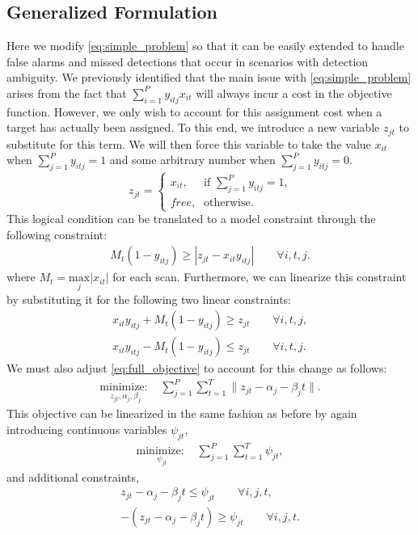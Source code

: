 \subsection{Generalized Formulation}
Here we modify \eqref{eq:simple_problem} so that it can be easily extended to handle false alarms and missed detections that occur in scenarios with detection ambiguity. We previously identified that the main issue with \eqref{eq:simple_problem} arises from the fact that $\sum_{i=1}^{P}y_{itj}x_{it}$ will always incur a cost in the objective function. However, we only wish to account for this assignment cost when a target has actually been assigned. To this end, we introduce a new variable $z_{jt}$ to substitute for this term. We will then force this variable to take the value $x_{it}$ when $\sum_{j=1}^{P}y_{itj}=1$ and some arbitrary number when $\sum_{j=1}^{P}y_{itj}=0$. 
\[z_{jt} =
\begin{cases}
x_{it}, & \text{if $\sum_{j=1}^{P} y_{itj} = 1$,} \\
\textit{free}, & \text{otherwise.}
\end{cases}\]
This logical condition can be translated to a model constraint through the following constraint:
\begin{align*}
M_{t}(1-y_{itj}) \geq |z_{jt} - x_{it}y_{itj}| \qquad \forall i,t,j.
\end{align*}
where $M_{t} = \underset{j}{\text{max}}|x_{it}|$ for each scan. Furthermore, we can linearize this constraint by substituting it for the following two linear constraints:
\begin{align*}
x_{it}y_{itj} + M_{t}(1-y_{itj}) \geq z_{jt} \qquad \forall i,t,j,\\
x_{it}y_{itj} - M_{t}(1-y_{itj}) \leq z_{jt} \qquad \forall i,t,j.
\end{align*}
We must also adjust \eqref{eq:full_objective} to account for this change as follows:
\begin{align}\label{eq:generalized_objective}
\underset{z_{jt}, \alpha_{j}, \beta_{j}}{\text{minimize: }} & \sum_{j=1}^{P} \sum_{t=1}^{T} \|z_{jt} - \alpha_{j} - \beta_{j}t\|.
\end{align}
This objective can be linearized in the same fashion as before by again introducing continuous variables $\psi_{jt}$,
\begin{align}\label{eq:generalized_linear_objective}
\underset{\psi_{jt}}{\text{minimize: }} & \sum_{j=1}^{P} \sum_{t=1}^{T} \psi_{jt},
\end{align}
and additional constraints,
\begin{align*}
z_{jt} - \alpha_{j} - \beta_{j}t \leq \psi_{jt} \qquad \forall i,j,t,\\
-(z_{jt} - \alpha_{j} - \beta_{j}t) \geq \psi_{jt} \qquad \forall i,j,t.
\end{align*}
